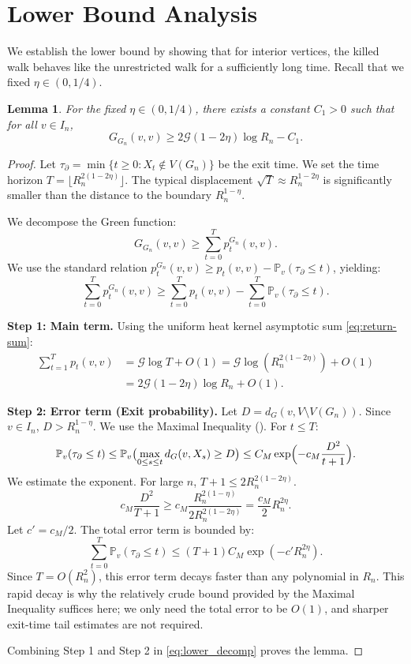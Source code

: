 \documentclass[12pt]{amsart}
\newtheorem{lemma}[theorem]{Lemma}
\theoremstyle{definition}
\theoremstyle{remark}
\newcommand{\cG}{\mathcal{G}}    %
\newcommand{\Prob}{\mathbb{P}}
\begin{document}
\section{Lower Bound Analysis}\label{sec:lower_bound}

We establish the lower bound by showing that for interior vertices, the killed walk behaves like the unrestricted walk for a sufficiently long time. Recall that we fixed $\eta \in (0, 1/4)$.

\begin{lemma}\label{lem:lower}
For the fixed $\eta \in (0,1/4)$, there exists a constant $C_1 > 0$ such that for all $v \in I_n$,
\[
G_{G_n}(v,v) \geq 2\cG(1-2\eta)\log R_n - C_1.
\]
\end{lemma}

\begin{proof}
Let $\tau_{\partial} = \min\{t \geq 0 : X_t \notin V(G_n)\}$ be the exit time. We set the time horizon $T = \lfloor R_n^{2(1-2\eta)} \rfloor$. The typical displacement $\sqrt{T} \approx R_n^{1-2\eta}$ is significantly smaller than the distance to the boundary $R_n^{1-\eta}$.

We decompose the Green function:
\[
G_{G_n}(v,v) \geq \sum_{t=0}^{T} p_t^{G_n}(v,v).
\]
We use the standard relation $p_t^{G_n}(v,v) \geq p_t(v,v) - \Prob_v(\tau_{\partial} \leq t)$, yielding:
\begin{equation}\label{eq:lower_decomp}
\sum_{t=0}^{T} p_t^{G_n}(v,v) \geq \sum_{t=0}^{T} p_t(v,v) - \sum_{t=0}^{T} \Prob_v(\tau_{\partial} \leq t).
\end{equation}

\textbf{Step 1: Main term.} Using the uniform heat kernel asymptotic sum \eqref{eq:return-sum}:
\begin{align*}
\sum_{t=1}^{T} p_t(v,v) &= \cG \log T + O(1) = \cG \log(R_n^{2(1-2\eta)}) + O(1) \\
&= 2\cG (1-2\eta)\log R_n + O(1).
\end{align*}

\textbf{Step 2: Error term (Exit probability).} Let $D = d_G(v, V \setminus V(G_n))$. Since $v \in I_n$, $D > R_n^{1-\eta}$. We use the Maximal Inequality (). For $t \leq T$:
\[
\Prob_v(\tau_{\partial} \leq t) \leq \Prob_v\bigl( \max_{0 \leq s \leq t} d_G(v,X_s) \geq D \bigr) \leq C_M \exp\Bigl(-c_M \frac{D^2}{t+1}\Bigr).
\]
We estimate the exponent. For large $n$, $T+1 \leq 2 R_n^{2(1-2\eta)}$.
\[
c_M \frac{D^2}{T+1} \geq c_M \frac{R_n^{2(1-\eta)}}{2 R_n^{2(1-2\eta)}} = \frac{c_M}{2} R_n^{2\eta}.
\]
Let $c' = c_M/2$. The total error term is bounded by:
\[
\sum_{t=0}^T \Prob_v(\tau_{\partial} \leq t) \leq (T+1) C_M \exp(-c' R_n^{2\eta}).
\]
Since $T = O(R_n^2)$, this error term decays faster than any polynomial in $R_n$. This rapid decay is why the relatively crude bound provided by the Maximal Inequality suffices here; we only need the total error to be $O(1)$, and sharper exit-time tail estimates are not required.

Combining Step 1 and Step 2 in \eqref{eq:lower_decomp} proves the lemma.
\end{proof}
\end{document}
